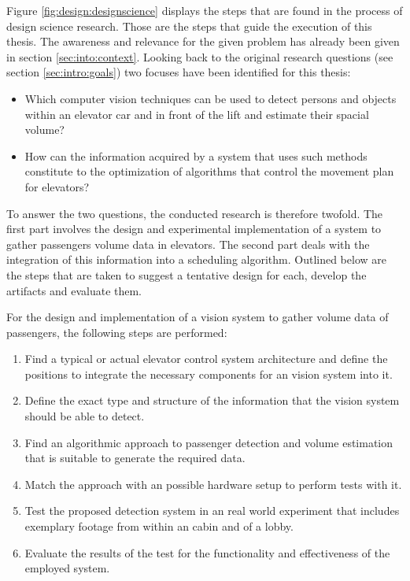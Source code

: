 Figure \ref{fig:design:designscience} displays the steps that are found in the process of design science research. 
Those are the steps that guide the execution of this thesis.
The awareness and relevance for the given problem has already been given in section \vref{sec:into:context}.
Looking back to the original research questions (see section \vref{sec:intro:goals}) two focuses have been identified for this thesis:

\begin{itemize}
    \item Which computer vision techniques can be used to detect persons and objects within an elevator car and in front of the lift and estimate their spacial volume?
    \item How can the information acquired by a system that uses such methods constitute to the optimization of algorithms that control the movement plan for elevators?
\end{itemize}


To answer the two questions, the conducted research is therefore twofold.
The first part involves the design and experimental implementation of a system to gather passengers volume data in elevators.
The second part deals with the integration of this information into a scheduling algorithm.
Outlined below are the steps that are taken to
suggest a tentative design for each, develop the artifacts and evaluate them.

For the  design and implementation of a vision system to gather volume data of passengers,
the following steps are performed:

\begin{enumerate}
    \item Find a typical or actual elevator control system architecture and define the positions to integrate the necessary components for an vision system into it.
    \item Define the exact type and structure of the information that the vision system should be able to detect.
    \item Find an algorithmic approach to  passenger detection and volume estimation that is suitable to generate the required data.
    \item Match the approach with an possible hardware setup to perform tests with it.
    \item Test the proposed detection system in an real world experiment that includes  exemplary footage from within an cabin and of a lobby.
    \item Evaluate the results of the test for the functionality and effectiveness of the employed system.
\end{enumerate}

